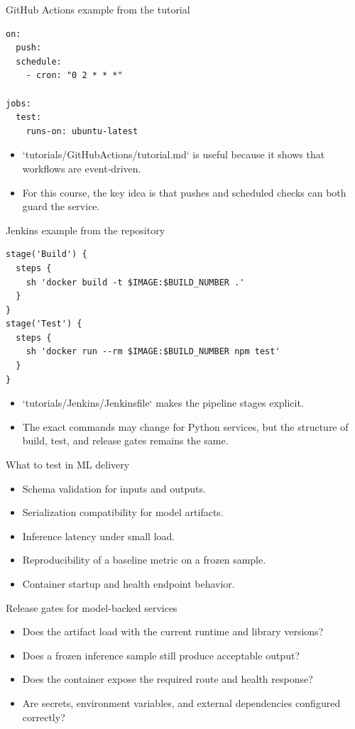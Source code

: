 \begin{frame}[fragile]{GitHub Actions example from the tutorial}
\begin{lstlisting}[style=coursepython]
on:
  push:
  schedule:
    - cron: "0 2 * * *"

jobs:
  test:
    runs-on: ubuntu-latest
\end{lstlisting}
\begin{itemize}
\item `tutorials/GitHubActions/tutorial.md` is useful because it shows that workflows are event-driven.
\item For this course, the key idea is that pushes and scheduled checks can both guard the service.
\end{itemize}
\coursefooter
\end{frame}

\begin{frame}[fragile]{Jenkins example from the repository}
\begin{lstlisting}[style=coursepython]
stage('Build') {
  steps {
    sh 'docker build -t $IMAGE:$BUILD_NUMBER .'
  }
}
stage('Test') {
  steps {
    sh 'docker run --rm $IMAGE:$BUILD_NUMBER npm test'
  }
}
\end{lstlisting}
\begin{itemize}
\item `tutorials/Jenkins/Jenkinsfile` makes the pipeline stages explicit.
\item The exact commands may change for Python services, but the structure of build, test, and release gates remains the same.
\end{itemize}
\coursefooter
\end{frame}

\begin{frame}{What to test in ML delivery}
\begin{itemize}
\item Schema validation for inputs and outputs.
\item Serialization compatibility for model artifacts.
\item Inference latency under small load.
\item Reproducibility of a baseline metric on a frozen sample.
\item Container startup and health endpoint behavior.
\end{itemize}
\coursefooter
\end{frame}

\begin{frame}{Release gates for model-backed services}
\begin{itemize}
\item Does the artifact load with the current runtime and library versions?
\item Does a frozen inference sample still produce acceptable output?
\item Does the container expose the required route and health response?
\item Are secrets, environment variables, and external dependencies configured correctly?
\end{itemize}
\coursefooter
\end{frame}

